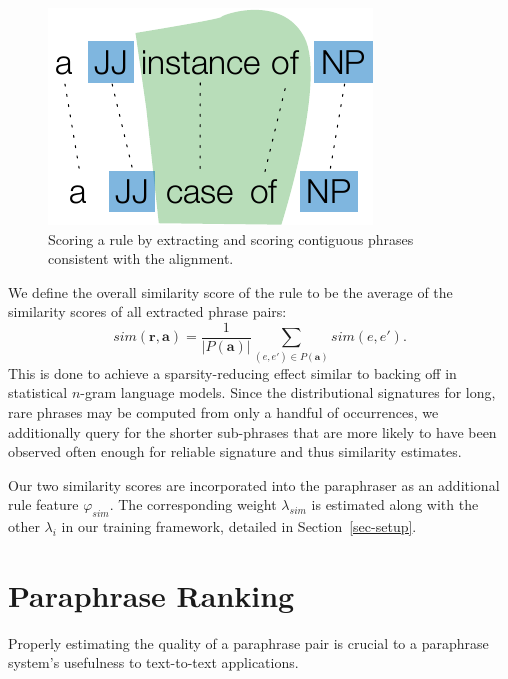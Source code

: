 \documentclass[11pt]{article}
\begin{document}
\begin{figure}[!t]
\begin{center}
\includegraphics[width=0.70\linewidth]{figures/pattern_scoring.pdf}
\end{center}
\caption{Scoring a rule by extracting and scoring contiguous phrases
  consistent with the alignment.}\label{fig-pattern-scoring}
\end{figure}

We define the overall similarity score of the rule to be the average
of the similarity scores of all extracted phrase pairs:
\begin{equation*}
  \mathit{sim}(\mathbf{r}, \mathbf{a}) = \frac{1}{|P(\mathbf{a})|}
  \sum_{(e, e') \in P(\mathbf{a})}\mathit{sim}(e, e') .
\end{equation*}
This is done to achieve a sparsity-reducing effect similar to backing
off in statistical $n$-gram language models. Since the distributional
signatures for long, rare phrases may be computed from only a handful
of occurrences, we additionally query for the shorter sub-phrases that
are more likely to have been observed often enough for reliable
signature and thus similarity estimates.

Our two similarity scores are incorporated into the paraphraser as an
additional rule feature $\varphi_{\mathit{sim}}$. The corresponding
weight $\lambda_{\mathit{sim}}$ is estimated along with the other
$\lambda_i$ in our training framework, detailed in
Section~\ref{sec-setup}.


\section{Paraphrase Ranking}
\label{sec-ranking}

Properly estimating the quality of a paraphrase pair is crucial to a
paraphrase system's usefulness to text-to-text applications. 
\end{document}
